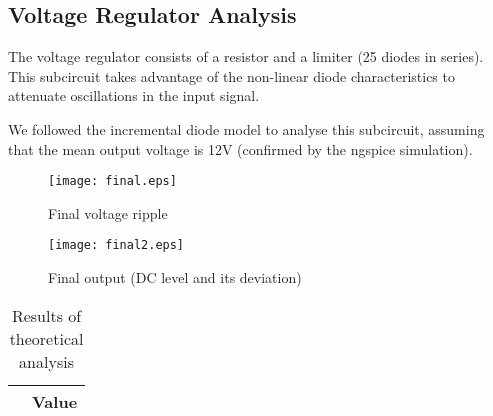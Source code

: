 \subsection{Voltage Regulator Analysis}

The voltage regulator consists of a resistor and a limiter (25 diodes in series). This subcircuit takes advantage of the non-linear diode characteristics to attenuate oscillations in the input signal.

We followed the incremental diode model to analyse this subcircuit, assuming that the mean output voltage is 12V (confirmed by the ngspice simulation).


\begin{figure}[h] \centering
  \begin{minipage}{.5\textwidth}
    \texttt{[image: final.eps]}
    \caption{Final voltage ripple}
    \label{fig:simenv}
    \end{minipage}%
  \begin{minipage}{.5\textwidth}
  \centering
    \texttt{[image: final2.eps]}
    \caption{Final output (DC level and its deviation)}
    \label{fig:compenv}
      \end{minipage}%
\end{figure}



\begin{table}[h]
  \centering
  \begin{tabular}{|c|c|}
    \hline    
     & { Value} \\ \hline
    
 \end{tabular}
 \caption{Results of theoretical analysis}
  \label{tab:op2}
\end{table}
